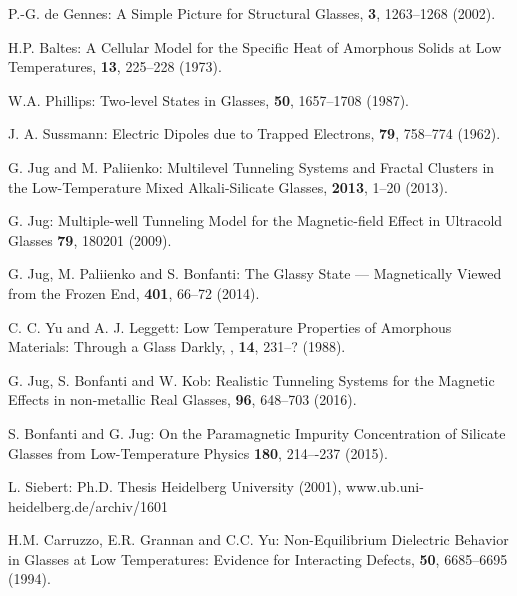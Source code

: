 \documentclass[10pt]{article}
\begin{document}
\begin{thebibliography}{99}
 P.-G. de Gennes:
\newblock A Simple Picture for Structural Glasses,
 {\bf 3}, 1263--1268 (2002).

 H.P. Baltes:
A Cellular Model for the Specific Heat of Amorphous Solids at Low Temperatures,
 {\bf 13}, 225--228 (1973).

 W.A. Phillips:
\newblock Two-level States in Glasses,
 {\bf 50}, 1657--1708 (1987).

 J. A. Sussmann:
\newblock Electric Dipoles due to Trapped Electrons,
 {\bf 79}, 758--774 (1962).

 G. Jug and M. Paliienko:
\newblock Multilevel Tunneling Systems and Fractal Clusters in the 
Low-Temperature Mixed Alkali-Silicate Glasses,
 {\bf 2013}, 1--20 (2013).

 G. Jug:
\newblock Multiple-well Tunneling Model for the Magnetic-field Effect in
Ultracold Glasses
 {\bf 79}, 180201 (2009).

 G. Jug, M. Paliienko and S. Bonfanti:
\newblock The Glassy State — Magnetically Viewed from the Frozen End,
 {\bf 401},  66--72 (2014).

 C. C. Yu and A. J. Leggett: 
\newblock Low Temperature Properties of Amorphous Materials: Through a Glass 
Darkly, 
, {\bf 14}, 231--? (1988).

 G. Jug, S. Bonfanti and W. Kob:
\newblock Realistic Tunneling Systems for the Magnetic Effects in non-metallic
Real Glasses,
 {\bf 96}, 648--703 (2016).



 S. Bonfanti and G. Jug:
\newblock On the Paramagnetic Impurity Concentration of Silicate Glasses 
from Low-Temperature Physics
 {\bf 180}, 214–-237 (2015).

 L. Siebert:
\newblock Ph.D. Thesis Heidelberg University (2001),
www.ub.uni-heidelberg.de/archiv/1601


 H.M. Carruzzo, E.R. Grannan and C.C. Yu:
\newblock Non-Equilibrium Dielectric Behavior in Glasses at Low Temperatures:
Evidence for Interacting Defects,
 {\bf 50}, 6685--6695 (1994).



\end{thebibliography}
\end{document}
